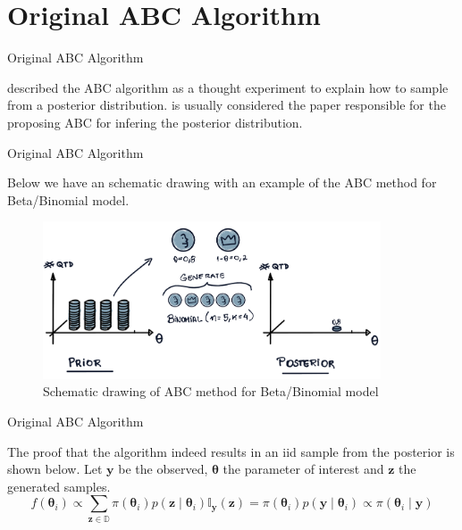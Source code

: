 \documentclass[10pt]{beamer}
\begin{document}
\section[Original]{Original ABC Algorithm}
\begin{frame}[fragile]{Original ABC Algorithm}

  \citet{Rubin1984} described the ABC algorithm as a thought experiment
  to explain how to sample from a posterior distribution.
  \citet{Tavare505} is usually considered the paper responsible for the
  proposing ABC for infering the posterior distribution.

  \vspace{1cm}

\begin{algorithm}[H]
\SetAlgoLined
{}
 \caption{Original ABC method}
\end{algorithm}


\end{frame}

\begin{frame}[fragile]{Original ABC Algorithm}

  Below we have an schematic drawing with an example of
  the ABC method for Beta/Binomial model.
    \begin{figure}[H]
        \centering
        \includegraphics[width=10cm]{images/Vis-ABC.png}
        \caption{Schematic drawing of ABC method for Beta/Binomial
        model}
    \end{figure}

\end{frame}

\begin{frame}[fragile]{Original ABC Algorithm}

  The proof that the algorithm indeed results in an iid sample
  from the posterior is shown below. Let $\bm y$ be the observed,
  $\bm \theta$ the parameter of interest and $\bm z$ the generated
  samples.
  $$
  f(\bm \theta_i) \propto \sum_{\bm z \in \mathbb{D}}
  \pi(\bm \theta_i) p(\bm z \mid \bm \theta_i) \mathbb I_{\bm y}(\bm z)
  = \pi(\bm \theta_i) p(\bm y \mid \bm \theta_i) \propto
  \pi(\bm \theta_i \mid \bm y)
  $$

\end{frame}
\end{document}
